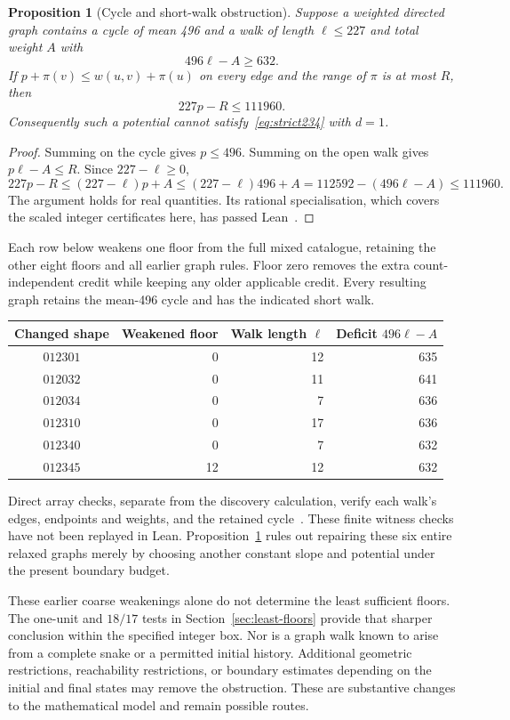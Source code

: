 \documentclass[11pt,a4paper]{article}
\newtheorem{proposition}[theorem]{Proposition}
\theoremstyle{definition}
\theoremstyle{remark}
\begin{document}
\begin{proposition}[Cycle and short-walk obstruction]\label{prop:short-walk-obstruction}
Suppose a weighted directed graph contains a cycle of mean 496 and a walk of length $\ell\le227$ and total weight $A$ with
\[
496\ell-A\ge632.
\]
If $p+\pi(v)\le w(u,v)+\pi(u)$ on every edge and the range of $\pi$ is at most $R$, then
\[
227p-R\le111960.
\]
Consequently such a potential cannot satisfy~\eqref{eq:strict234} with $d=1$.
\end{proposition}
\begin{proof}
Summing on the cycle gives $p\le496$. Summing on the open walk gives $p\ell-A\le R$. Since $227-\ell\ge0$,
\[
227p-R\le(227-\ell)p+A
\le(227-\ell)496+A
=112592-(496\ell-A)\le111960.
\]
The argument holds for real quantities. Its rational specialisation, which covers the scaled integer certificates here, has passed Lean~\cite{obstructionarchive}.
\end{proof}

Each row below weakens one floor from the full mixed catalogue, retaining the other eight floors and all earlier graph rules. Floor zero removes the extra count-independent credit while keeping any older applicable credit. Every resulting graph retains the mean-496 cycle and has the indicated short walk.
\begin{center}\small
\begin{tabular}{c r r r}
\toprule
Changed shape & Weakened floor & Walk length $\ell$ & Deficit $496\ell-A$\\\midrule
$012301$ & 0 & 12 & 635\\
$012032$ & 0 & 11 & 641\\
$012034$ & 0 & 7 & 636\\
$012310$ & 0 & 17 & 636\\
$012340$ & 0 & 7 & 632\\
$012345$ & 12 & 12 & 632\\
\bottomrule
\end{tabular}
\end{center}
Direct array checks, separate from the discovery calculation, verify each walk's edges, endpoints and weights, and the retained cycle~\cite{obstructionarchive}. These finite witness checks have not been replayed in Lean. Proposition~\ref{prop:short-walk-obstruction} rules out repairing these six entire relaxed graphs merely by choosing another constant slope and potential under the present boundary budget.

These earlier coarse weakenings alone do not determine the least sufficient floors. The one-unit and $18/17$ tests in Section~\ref{sec:least-floors} provide that sharper conclusion within the specified integer box. Nor is a graph walk known to arise from a complete snake or a permitted initial history. Additional geometric restrictions, reachability restrictions, or boundary estimates depending on the initial and final states may remove the obstruction. These are substantive changes to the mathematical model and remain possible routes.
\end{document}
